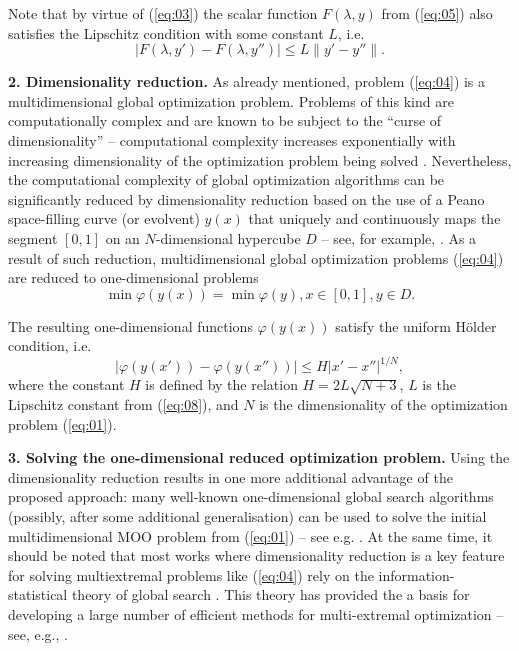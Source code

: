 \documentclass[runningheads]{llncs}
\begin{document}
Note that by virtue of (\ref{eq:03}) the scalar function $F(\lambda,y)$ from (\ref{eq:05}) also satisfies the Lipschitz condition with some constant $L$, i.e.
\begin{equation}
\label{eq:08}
|F(\lambda, y') - F(\lambda, y'')| \leq L\|y' - y''\|.
\end{equation}

\textbf{2. Dimensionality reduction.} As already mentioned, problem (\ref{eq:04}) is a multidimensional global optimization problem. Problems of this kind are computationally complex and are known to be subject to the ``curse of dimensionality'' -- computational complexity increases exponentially with increasing dimensionality of the optimization problem being solved \cite{c13,c14,c15,c16,c17,c18,c19,c20}. Nevertheless, the computational complexity of global optimization algorithms can be significantly reduced by dimensionality reduction based on the use of a Peano space-filling curve (or evolvent) $y(x)$ that uniquely and continuously maps the segment $[0,1]$ on an $N$-dimensional hypercube $D$ -- see, for example, \cite{c15,c21}. As a result of such reduction, multidimensional global optimization problems (\ref{eq:04}) are reduced to one-dimensional problems
\begin{equation}
\label{eq:09}
\min \varphi (y(x))= \min \varphi(y), x \in [0,1], y \in D.
\end{equation}

The resulting one-dimensional functions $\varphi(y(x))$ satisfy the uniform H{\" o}lder condition, i.e.
\begin{equation}
\label{eq:10}
|\varphi (y(x'))- \varphi (y(x''))| \leq H |x'-x''|^{1/N},
\end{equation}
where the constant $H$ is defined by the relation $H=2L\sqrt{N+3}$, $L$ is the Lipschitz constant from (\ref{eq:08}), and $N$ is the dimensionality of the optimization problem (\ref{eq:01}). 


\textbf{3. Solving the one-dimensional reduced optimization problem.} Using the dimensionality reduction results in one more additional advantage of the proposed approach: many well-known one-dimensional global search algorithms (possibly, after some additional generalisation) can be used to solve the initial multidimensional MOO problem from (\ref{eq:01}) -- see e.g. \cite{c22,c23,c24,c25,c26,c27,c28,c29}. At the same time, it should be noted that most works where dimensionality reduction is a key feature for solving multiextremal problems like (\ref{eq:04}) rely on the information-statistical theory of global search \cite{c15}. This theory has provided the a basis for developing a large number of efficient methods for multi-extremal optimization -- see, e.g., \cite{c28,c29,c30,c31,c32,c33,c34,c35,c36,c37}.
\end{document}
